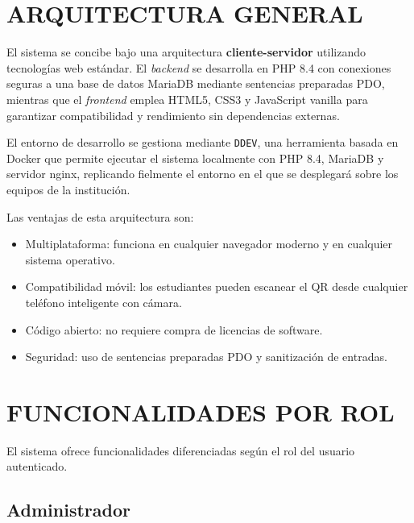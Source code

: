 \documentclass[12pt, letterpaper, oneside]{report}
\begin{document}
\newpage

\chapter{ARQUITECTURA GENERAL}

El sistema se concibe bajo una arquitectura \textbf{cliente-servidor} utilizando tecnolog\'ias web est\'andar. El \emph{backend} se desarrolla en PHP 8.4 con conexiones seguras a una base de datos MariaDB mediante sentencias preparadas PDO, mientras que el \emph{frontend} emplea HTML5, CSS3 y JavaScript vanilla para garantizar compatibilidad y rendimiento sin dependencias externas.

El entorno de desarrollo se gestiona mediante \texttt{DDEV}, una herramienta basada en Docker que permite ejecutar el sistema localmente con PHP 8.4, MariaDB y servidor nginx, replicando fielmente el entorno en el que se desplegar\'a sobre los equipos de la instituci\'on.

Las ventajas de esta arquitectura son:

\begin{itemize}
  \item Multiplataforma: funciona en cualquier navegador moderno y en cualquier sistema operativo.
  \item Compatibilidad m\'ovil: los estudiantes pueden escanear el QR desde cualquier tel\'efono inteligente con c\'amara.
  \item C\'odigo abierto: no requiere compra de licencias de software.
  \item Seguridad: uso de sentencias preparadas PDO y sanitizaci\'on de entradas.
\end{itemize}

\newpage

\chapter{FUNCIONALIDADES POR ROL}

El sistema ofrece funcionalidades diferenciadas seg\'un el rol del usuario autenticado.

\section{Administrador}
\end{document}
